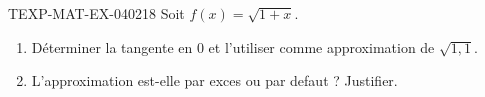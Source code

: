 \begin{exercice}{TEXP-MAT-EX-040}{2}{18}
Soit $f(x) = \sqrt{1+x}$.
\begin{enumerate}
  \item Déterminer la tangente en $0$ et l'utiliser comme approximation de $\sqrt{1{,}1}$.
  \item L'approximation est-elle par exces ou par defaut ? Justifier.
\end{enumerate}

\end{exercice}
